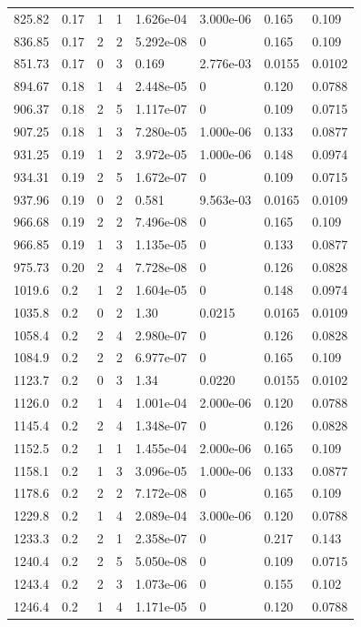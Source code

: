 \documentclass[preview]{standalone}
\begin{document}
{{{\begin{tabular}{L{1.2cm}C{1.2cm} C{0.3cm}C{0.5cm} C{1.4cm}C{1.4cm} C{1.4cm}C{1.4cm}}
  825.82  &  0.17  & 1     &  1 &  1.626e-04  & 3.000e-06  & 0.165 &  0.109   \\ 
  836.85  &  0.17  & 2     &  2 &  5.292e-08  & 0  & 0.165 &  0.109   \\ 
  851.73  &  0.17  & 0     &  3 &  0.169  & 2.776e-03  & 0.0155 &  0.0102   \\ 
  894.67  &  0.18  & 1     &  4 &  2.448e-05  & 0  & 0.120 &  0.0788   \\ 
  906.37  &  0.18  & 2     &  5 &  1.117e-07  & 0  & 0.109 &  0.0715   \\ 
  907.25  &  0.18  & 1     &  3 &  7.280e-05  & 1.000e-06  & 0.133 &  0.0877   \\ 
  931.25  &  0.19  & 1     &  2 &  3.972e-05  & 1.000e-06  & 0.148 &  0.0974   \\ 
  934.31  &  0.19  & 2     &  5 &  1.672e-07  & 0  & 0.109 &  0.0715   \\ 
  937.96  &  0.19  & 0     &  2 &  0.581  & 9.563e-03  & 0.0165 &  0.0109   \\ 
  966.68  &  0.19  & 2     &  2 &  7.496e-08  & 0  & 0.165 &  0.109   \\ 
  966.85  &  0.19  & 1     &  3 &  1.135e-05  & 0  & 0.133 &  0.0877   \\ 
  975.73  &  0.20  & 2     &  4 &  7.728e-08  & 0  & 0.126 &  0.0828   \\ 
  1019.6  &   0.2  & 1     &  2 &  1.604e-05  & 0  & 0.148 &  0.0974   \\ 
  1035.8  &   0.2  & 0     &  2 &  1.30  & 0.0215  & 0.0165 &  0.0109   \\ 
  1058.4  &   0.2  & 2     &  4 &  2.980e-07  & 0  & 0.126 &  0.0828   \\ 
  1084.9  &   0.2  & 2     &  2 &  6.977e-07  & 0  & 0.165 &  0.109   \\ 
  1123.7  &   0.2  & 0     &  3 &  1.34  & 0.0220  & 0.0155 &  0.0102   \\ 
  1126.0  &   0.2  & 1     &  4 &  1.001e-04  & 2.000e-06  & 0.120 &  0.0788   \\ 
  1145.4  &   0.2  & 2     &  4 &  1.348e-07  & 0  & 0.126 &  0.0828   \\ 
  1152.5  &   0.2  & 1     &  1 &  1.455e-04  & 2.000e-06  & 0.165 &  0.109   \\ 
  1158.1  &   0.2  & 1     &  3 &  3.096e-05  & 1.000e-06  & 0.133 &  0.0877   \\ 
  1178.6  &   0.2  & 2     &  2 &  7.172e-08  & 0  & 0.165 &  0.109   \\ 
  1229.8  &   0.2  & 1     &  4 &  2.089e-04  & 3.000e-06  & 0.120 &  0.0788   \\ 
  1233.3  &   0.2  & 2     &  1 &  2.358e-07  & 0  & 0.217 &  0.143   \\ 
  1240.4  &   0.2  & 2     &  5 &  5.050e-08  & 0  & 0.109 &  0.0715   \\ 
  1243.4  &   0.2  & 2     &  3 &  1.073e-06  & 0  & 0.155 &  0.102   \\ 
  1246.4  &   0.2  & 1     &  4 &  1.171e-05  & 0  & 0.120 &  0.0788   \\ 
\hline 
\end{tabular} 

}}}
\end{document}
